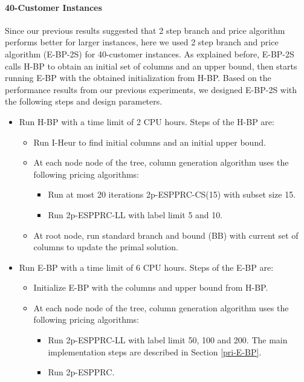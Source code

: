 \paragraph{40-Customer Instances}
Since our previous results suggested that 2 step branch and price algorithm
performs better for larger instances, here we used 2 step branch and price
algorithm (E-BP-2S) for 40-customer instances. As explained before, E-BP-2S
calls H-BP to obtain an initial set of columns and an upper bound, then
starts running E-BP with the obtained initialization from H-BP.
Based on  the performance results from our previous experiments, we designed
E-BP-2S with the following steps and design parameters.
\begin{itemize}
\item Run H-BP with a time limit of 2 CPU hours. Steps of the H-BP are:
  \begin{itemize}
  \item Run I-Heur to find initial columns and an initial upper bound.
  \item At each node node of the tree, column generation algorithm
    uses the following pricing algorithms:
    \begin{itemize}
    \item Run at most 20 iterations 2p-ESPPRC-CS(15) with subset size 15.
    \item Run 2p-ESPPRC-LL with label limit 5 and 10.
    \end{itemize}
  \item At root node, run standard branch and bound (BB) with current
    set of columns to update the primal solution.
  \end{itemize}
\item Run E-BP with a time limit of 6 CPU hours. Steps of the E-BP are:
  \begin{itemize}
  \item Initialize E-BP with the columns and upper bound from H-BP.
  \item At each node node of the tree, column generation algorithm
    uses the following pricing algorithms:
    \begin{itemize}
    \item  Run 2p-ESPPRC-LL with label limit 50, 100 and 200. The main
      implementation steps are described in Section \ref{pri-E-BP}.
    \item Run 2p-ESPPRC.
    \end{itemize}
  \end{itemize}
\end{itemize}
